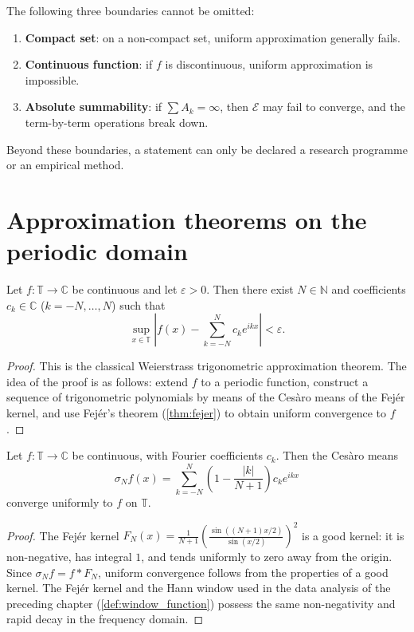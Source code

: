 \begin{remark}\label{rem:boundary-necessity}
The following three boundaries cannot be omitted:
\begin{enumerate}[label=(\roman*)]
    \item \textbf{Compact set}: on a non-compact set, uniform approximation generally fails.
    \item \textbf{Continuous function}: if $f$ is discontinuous, uniform approximation is impossible.
    \item \textbf{Absolute summability}: if $\sum A_k=\infty$, then $\mathcal E$ may fail to converge, and the term-by-term operations break down.
\end{enumerate}
Beyond these boundaries, a statement can only be declared a research programme or an empirical method.
\end{remark}

\section{Approximation theorems on the periodic domain}

\begin{theorem}\label{thm:weierstrass-trig}
Let $f:\mathbb T\to\mathbb C$ be continuous and let $\varepsilon>0$. Then there exist $N\in\mathbb N$ and coefficients $c_k\in\mathbb C$ ($k=-N,\dots,N$) such that
\[
\sup_{x\in\mathbb T}\left|f(x)-\sum_{k=-N}^{N}c_k e^{ikx}\right|<\varepsilon.
\]
\end{theorem}

\begin{proof}
This is the classical Weierstrass trigonometric approximation theorem. The idea of the proof is as follows: extend $f$ to a periodic function, construct a sequence of trigonometric polynomials by means of the Cesàro means of the Fejér kernel, and use Fejér's theorem (\cref{thm:fejer}) to obtain uniform convergence to $f$.
\end{proof}

\begin{theorem}\label{thm:fejer}
Let $f:\mathbb T\to\mathbb C$ be continuous, with Fourier coefficients $c_k$. Then the Cesàro means
\[
\sigma_N f(x)=\sum_{k=-N}^{N}\left(1-\frac{|k|}{N+1}\right)c_k e^{ikx}
\]
converge uniformly to $f$ on $\mathbb T$.
\end{theorem}

\begin{proof}
The Fejér kernel $F_N(x)=\frac{1}{N+1}\left(\frac{\sin((N+1)x/2)}{\sin(x/2)}\right)^2$ is a good kernel: it is non-negative, has integral $1$, and tends uniformly to zero away from the origin. Since $\sigma_N f=f*F_N$, uniform convergence follows from the properties of a good kernel. The Fejér kernel and the Hann window used in the data analysis of the preceding chapter (\cref{def:window_function}) possess the same non-negativity and rapid decay in the frequency domain.
\end{proof}

